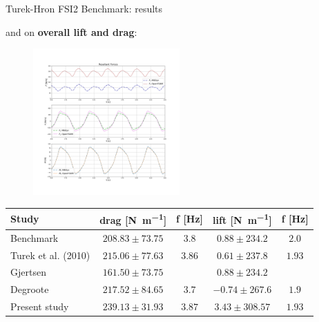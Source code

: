 \documentclass[10pt,t]{beamer}
\begin{document}
\begin{frame}{Turek-Hron FSI2 Benchmark: results}

and on \textbf{overall lift and drag}:
\begin{figure}[htbp!]
	\centering
	\includegraphics[width=0.5\textwidth, trim=20 420 20 120, clip]{images/FSI2/forces_fsi2.png}
\end{figure}


\footnotesize
\begin{center}
\begin{tabular}{ l | c c | c c  |  } 
	Study & drag [\si{N.m^{-1}}] & f [\si{Hz}] & lift [\si{N.m^{-1}}] & f [\si{Hz}]    \\ 
	\hline
	\hline
	Benchmark & $208.83\pm73.75$ & $3.8$ & $0.88\pm234.2$ & $2.0$     \\
	Turek et al. (2010) & $215.06\pm77.63$ & $3.86$ & $0.61\pm237.8$ & $1.93$\\   
	Gjertsen & $161.50\pm73.75$ & & $0.88\pm234.2$ & \\
	Degroote  & $217.52\pm84.65$ & $3.7$ & $-0.74\pm267.6$ & $1.9$ \\
	\hline
	Present study & $239.13\pm31.93$ & $3.87$ & $3.43\pm308.57$ & $1.93$ \\
\end{tabular}
    
\end{center}

\end{frame}
\end{document}
